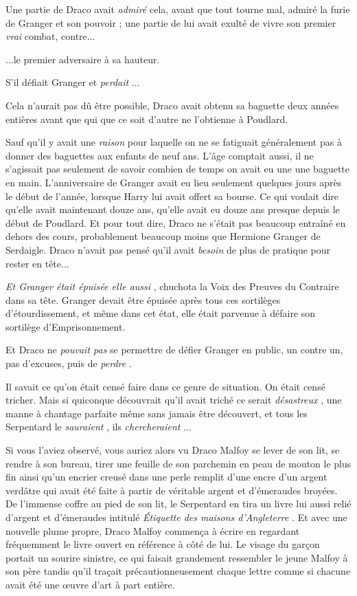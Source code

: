 Une partie de Draco avait \emph{admiré}  cela, avant que tout tourne mal, admiré la furie de Granger et son pouvoir ; une partie de lui avait exulté de vivre son premier \emph{vrai}  combat, contre...

...le premier adversaire à sa hauteur.

S'il défiait Granger et \emph{perdait} ...

Cela n'aurait pas dû être possible, Draco avait obtenu sa baguette deux années entières avant que qui que ce soit d'autre ne l'obtienne à Poudlard.

Sauf qu'il y avait une \emph{raison}  pour laquelle on ne se fatiguait généralement pas à donner des baguettes aux enfants de neuf ans. L'âge comptait aussi, il ne s'agissait pas seulement de savoir combien de temps on avait eu une une baguette en main. L'anniversaire de Granger avait eu lieu seulement quelques jours après le début de l'année, lorsque Harry lui avait offert sa bourse. Ce qui voulait dire qu'elle avait maintenant douze ans, qu'elle avait eu douze ans presque depuis le début de Poudlard. Et pour tout dire, Draco ne s'était pas beaucoup entraîné en dehors des cours, probablement beaucoup moins que Hermione Granger de Serdaigle. Draco n'avait pas pensé qu'il avait \emph{besoin } de plus de pratique pour rester en tête...

\emph{Et Granger était épuisée elle aussi} , chuchota la Voix des Preuves du Contraire dans sa tête. Granger devait être épuisée après tous ces sortilèges d'étourdissement, et même dans cet état, elle était parvenue à défaire son sortilège d'Emprisonnement.

Et Draco ne \emph{pouvait pas}  se permettre de défier Granger en public, un contre un, pas d'excuses, puis de \emph{perdre} .

Il savait ce qu'on était censé faire dans ce genre de situation. On était censé tricher. Mais si quiconque découvrait qu'il avait triché ce serait \emph{désastreux} , une manne à chantage parfaite même sans jamais être découvert, et tous les Serpentard le \emph{sauraient} , ils \emph{chercheraient} ...

Si vous l'aviez observé, vous auriez alors vu Draco Malfoy se lever de son lit, se rendre à son bureau, tirer une feuille de son parchemin en peau de mouton le plus fin ainsi qu'un encrier creusé dans une perle remplit d'une encre d'un argent verdâtre qui avait été faite à partir de véritable argent et d'émeraudes broyées. De l'immense coffre au pied de son lit, le Serpentard en tira un livre lui aussi relié d'argent et d'émeraudes intitulé \emph{Étiquette des maisons d'Angleterre} . Et avec une nouvelle plume propre, Draco Malfoy commença à écrire en regardant fréquemment le livre ouvert en référence à côté de lui. Le visage du garçon portait un sourire sinistre, ce qui faisait grandement ressembler le jeune Malfoy à son père tandis qu'il traçait précautionneusement chaque lettre comme si chacune avait été une œuvre d'art à part entière.

